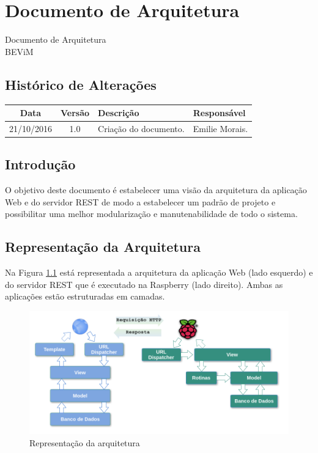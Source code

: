 \chapter{Documento de Arquitetura} \label{documento_arquitetura}

\begin{center}
 {\large Documento de Arquitetura}\\[0.2cm]
 {BEViM}\\
 \end{center}
 
 \section*{Histórico de Alterações}
\begin{table}[h]
\centering
\begin{tabular}{|c|c|p{6cm}|p{5cm}|}
\hline
Data & Versão & Descrição & Responsável\\
\hline                               
21/10/2016 & 1.0 & Criação do documento. & Emilie Morais.\\
\hline
\end{tabular}
\end{table}

\section*{Introdução}
	
    O objetivo deste documento é estabelecer uma visão da arquitetura da aplicação Web e do servidor REST de modo a estabelecer 
    um padrão de projeto e possibilitar uma melhor modularização e manutenabilidade de todo o sistema. 

\section*{Representação da Arquitetura}

Na Figura \ref{fig:representacao_arquitetura} está representada a arquitetura da aplicação Web (lado esquerdo) e do
servidor REST que é executado na Raspberry (lado direito). Ambas as aplicações estão estruturadas em camadas. 

\begin{figure}[!ht]
\centering
\includegraphics[keepaspectratio=true,scale=0.5]{figuras/representacao_arquitetura.png}
\caption{Representação da arquitetura}
\label{fig:representacao_arquitetura} 
\end{figure} 

